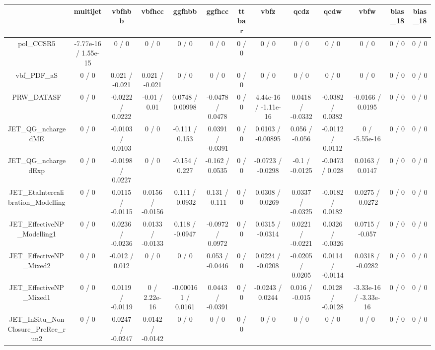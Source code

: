 \documentclass[10pt]{article}
\begin{document}
\begin{table}[htbp]
\begin{center}
\begin{tabular}{|c|c|c|c|c|c|c|c|c|c|c|c|c|}
\hline 
      & multijet      & vbfhbb      & vbfhcc      & ggfhbb      & ggfhcc      & ttbar      & vbfz      & qcdz      & qcdw      & vbfw      & bias_18      & bias_18 \\ 
\hline 
  pol_CCSR5 & -7.77e-16 / 1.55e-15 & 0 / 0 & 0 / 0 & 0 / 0 & 0 / 0 & 0 / 0 & 0 / 0 & 0 / 0 & 0 / 0 & 0 / 0 & 0 / 0 & 0 / 0 \\ 
  vbf_PDF_aS & 0 / 0 & 0.021 / -0.021 & 0.021 / -0.021 & 0 / 0 & 0 / 0 & 0 / 0 & 0 / 0 & 0 / 0 & 0 / 0 & 0 / 0 & 0 / 0 & 0 / 0 \\ 
  PRW_DATASF & 0 / 0 & -0.0222 / 0.0222 & -0.01 / 0.01 & 0.0748 / 0.00998 & -0.0478 / 0.0478 & 0 / 0 & 4.44e-16 / -1.11e-16 & 0.0418 / -0.0332 & -0.0382 / 0.0382 & -0.0166 / 0.0195 & 0 / 0 & 0 / 0 \\ 
  JET_QG_nchargedME & 0 / 0 & -0.0103 / 0.0103 & 0 / 0 & -0.111 / 0.153 & 0.0391 / -0.0391 & 0 / 0 & 0.0103 / -0.00895 & 0.056 / -0.056 & -0.0112 / 0.0112 & 0 / -5.55e-16 & 0 / 0 & 0 / 0 \\ 
  JET_QG_nchargedExp & 0 / 0 & -0.0198 / 0.0227 & 0 / 0 & -0.154 / 0.227 & -0.162 / 0.0535 & 0 / 0 & -0.0723 / -0.0298 & -0.1 / -0.0125 & -0.0473 / 0.028 & 0.0163 / 0.0147 & 0 / 0 & 0 / 0 \\ 
  JET_EtaIntercalibration_Modelling & 0 / 0 & 0.0115 / -0.0115 & 0.0156 / -0.0156 & 0.111 / -0.0932 & 0.131 / -0.111 & 0 / 0 & 0.0308 / -0.0269 & 0.0337 / -0.0325 & -0.0182 / 0.0182 & 0.0275 / -0.0272 & 0 / 0 & 0 / 0 \\ 
  JET_EffectiveNP_Modelling1 & 0 / 0 & 0.0236 / -0.0236 & 0.0133 / -0.0133 & 0.118 / -0.0947 & -0.0972 / 0.0972 & 0 / 0 & 0.0315 / -0.0314 & 0.0221 / -0.0221 & 0.0326 / -0.0326 & 0.0715 / -0.057 & 0 / 0 & 0 / 0 \\ 
  JET_EffectiveNP_Mixed2 & 0 / 0 & -0.012 / 0.012 & 0 / 0 & 0 / 0 & 0.053 / -0.0446 & 0 / 0 & 0.0224 / -0.0208 & -0.0205 / 0.0205 & 0.0114 / -0.0114 & 0.0318 / -0.0282 & 0 / 0 & 0 / 0 \\ 
  JET_EffectiveNP_Mixed1 & 0 / 0 & 0.0119 / -0.0119 & 0 / 2.22e-16 & -0.000161 / 0.0161 & 0.0443 / -0.0391 & 0 / 0 & -0.0243 / 0.0244 & 0.016 / -0.015 & 0.0128 / -0.0128 & -3.33e-16 / -3.33e-16 & 0 / 0 & 0 / 0 \\ 
  JET_InSitu_NonClosure_PreRec_run2 & 0 / 0 & 0.0247 / -0.0247 & 0.0142 / -0.0142 & 0 / 0 & 0 / 0 & 0 / 0 & 0 / 0 & 0 / 0 & 0 / 0 & 0 / 0 & 0 / 0 & 0 / 0 \\ 

\end{tabular}
\end{center}
\end{table}
\end{document}
